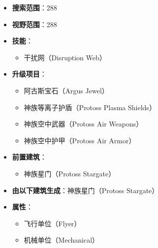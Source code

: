 \begin{tcolorbox}[colback=white, colframe=black!60!white, title=Protoss\_Corsair(), arc=0mm]
\begin{itemize}
        \item \textbf{搜索范围}：288
        \item \textbf{视野范围}：288
        \item \textbf{技能}：
            \begin{itemize}
                \item 干扰网（Disruption Web）
            \end{itemize}
        \item \textbf{升级项目}：
            \begin{itemize}
                \item 阿古斯宝石（Argus Jewel）
                \item 神族等离子护盾（Protoss Plasma Shields）
                \item 神族空中武器（Protoss Air Weapons）
                \item 神族空中护甲（Protoss Air Armor）
            \end{itemize}
        \item \textbf{前置建筑}：
            \begin{itemize}
                \item 神族星门（Protoss Stargate）
            \end{itemize}
        \item \textbf{由以下建筑生成}：神族星门（Protoss Stargate）
        \item \textbf{属性}：
            \begin{itemize}
                \item 飞行单位（Flyer）
                \item 机械单位（Mechanical）
            \end{itemize}
    \end{itemize}
\end{tcolorbox}

